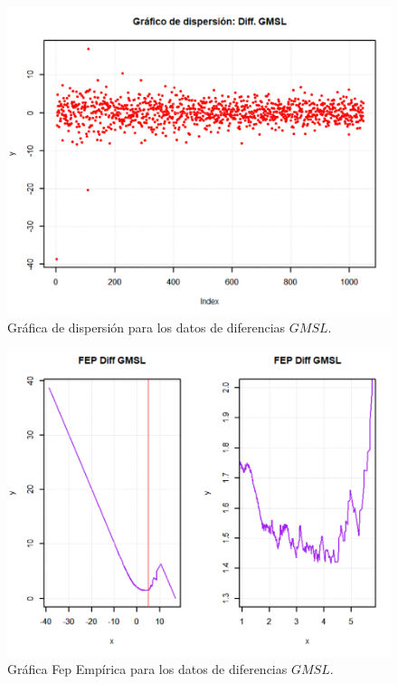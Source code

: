 \documentclass[10.5pt,notitlepage]{article}
\theoremstyle{plain}
\begin{document}
\begin{figure}[htb]
    \centering
    \includegraphics[scale = 0.4]{incisoc/DDisp.png}
    \caption{Gráfica de dispersión para los datos de diferencias \(GMSL\).}
    \label{fig:17}
\end{figure}


\begin{figure}[htb]
    \centering
    \includegraphics[scale = 0.4]{incisoc/DFepGMSL.png}
    \caption{Gráfica Fep Empírica para los datos de diferencias \(GMSL\).}
    \label{fig:17.1}
\end{figure}
\end{document}
